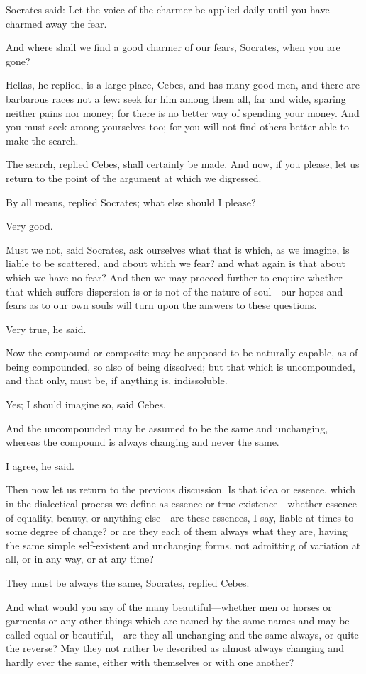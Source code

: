 Socrates said: Let the voice of the charmer be applied daily until you
have charmed away the fear.

And where shall we find a good charmer of our fears, Socrates, when you
are gone?

Hellas, he replied, is a large place, Cebes, and has many good men, and
there are barbarous races not a few: seek for him among them all, far and
wide, sparing neither pains nor money; for there is no better way of
spending your money. And you must seek among yourselves too; for you will
not find others better able to make the search.

The search, replied Cebes, shall certainly be made. And now, if you
please, let us return to the point of the argument at which we digressed.

By all means, replied Socrates; what else should I please?

Very good.

Must we not, said Socrates, ask ourselves what that is which, as we
imagine, is liable to be scattered, and about which we fear? and what
again is that about which we have no fear? And then we may proceed further
to enquire whether that which suffers dispersion is or is not of the
nature of soul—our hopes and fears as to our own souls will turn
upon the answers to these questions.

Very true, he said.

Now the compound or composite may be supposed to be naturally capable, as
of being compounded, so also of being dissolved; but that which is
uncompounded, and that only, must be, if anything is, indissoluble.

Yes; I should imagine so, said Cebes.

And the uncompounded may be assumed to be the same and unchanging, whereas
the compound is always changing and never the same.

I agree, he said.

Then now let us return to the previous discussion. Is that idea or
essence, which in the dialectical process we define as essence or true
existence—whether essence of equality, beauty, or anything else—are
these essences, I say, liable at times to some degree of change? or are
they each of them always what they are, having the same simple
self-existent and unchanging forms, not admitting of variation at all, or
in any way, or at any time?

They must be always the same, Socrates, replied Cebes.

And what would you say of the many beautiful—whether men or horses
or garments or any other things which are named by the same names and may
be called equal or beautiful,—are they all unchanging and the same
always, or quite the reverse? May they not rather be described as almost
always changing and hardly ever the same, either with themselves or with
one another?

